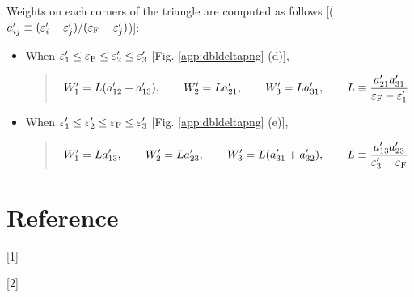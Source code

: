 \documentclass[letterpaper,10pt,pdftex,openany,english]{sphinxmanual}
\begin{document}
\sphinxAtStartPar
Weights on each corners of the triangle are computed as follows
{[}(\(a'_{i j} \equiv (\varepsilon'_i - \varepsilon'_j)/(\varepsilon_{\rm F} - \varepsilon'_j)\)){]}:
\begin{itemize}
\item {} 
\sphinxAtStartPar
When \(\varepsilon'_1 \leq \varepsilon_{\rm F} \leq \varepsilon'_2 \leq \varepsilon'_3\) {[}Fig. \ref{app:dbldeltapng} (d){]},
\begin{quote}
\begin{equation*}
\begin{split}\begin{align}
W'_1 = L (a'_{1 2} + a'_{1 3}), \qquad
W'_2 = L a'_{2 1}, \qquad
W'_3 = L a'_{3 1}, \qquad
L \equiv \frac{a'_{2 1} a'_{3 1}}{\varepsilon_{\rm F} - \varepsilon'_{1}}
\end{align}\end{split}
\end{equation*}\end{quote}

\item {} 
\sphinxAtStartPar
When \(\varepsilon'_1 \leq \varepsilon'_2 \leq \varepsilon_{\rm F} \leq \varepsilon'_3\) {[}Fig. \ref{app:dbldeltapng} (e){]},
\begin{quote}
\begin{equation*}
\begin{split}\begin{align}
W'_1 = L a'_{1 3}, \qquad
W'_2 = L a'_{2 3}, \qquad
W'_3 = L (a'_{3 1} + a'_{3 2}), \qquad
L \equiv \frac{a'_{1 3} a'_{2 3}}{\varepsilon'_{3} - \varepsilon_{\rm F}}
\end{align}\end{split}
\end{equation*}\end{quote}

\end{itemize}

\sphinxstepscope


\chapter{Reference}
\label{\detokenize{ref:reference}}\label{\detokenize{ref:ref}}\label{\detokenize{ref::doc}}
\sphinxAtStartPar
{[}1{]} 

\sphinxAtStartPar
{[}2{]} 



\renewcommand{\indexname}{Index}
\printindex
\end{document}
